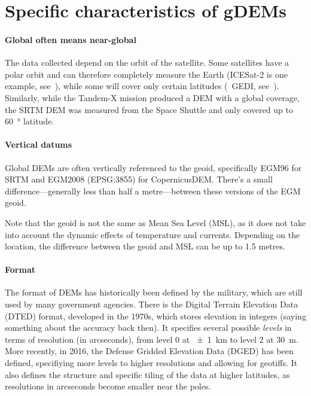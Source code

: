 %
\section[Specific characteristics]{Specific characteristics of gDEMs}

\paragraph{Global often means near-global}

The data collected depend on the orbit of the satellite.
Some satellites have a polar orbit and can therefore completely measure the Earth (ICESat-2 is one example, see~), while some will cover only certain latitudes (\eg\ GEDI, see~).
Similarly, while the Tandem-X mission produced a DEM with a global coverage, the SRTM DEM was measured from the Space Shuttle and only covered up to \qty{60}{\degree} latitude.


\paragraph{Vertical datums}
Global DEMs are often vertically referenced to the geoid, specifically EGM96 for SRTM and EGM2008 (EPSG:3855) for CopernicusDEM.
There's a small difference---generally less than half a metre---between these versions of the EGM geoid.

Note that the geoid is not the same as Mean Sea Level (MSL), as it does not take into account the dynamic effects of temperature and currents.
Depending on the location, the difference between the geoid and MSL can be up to 1.5 metres.

\paragraph{Format}  %
The format of DEMs has historically been defined by the military, which are still used by many government agencies.
There is the Digital Terrain Elevation Data (DTED) format, developed in the 1970s, which stores elevation in integers (saying something about the accuracy back then).
It specifies several possible \emph{levels} in terms of resolution (in arcseconds), from level 0 at \qty{\pm1}{km} to level 2 at \qty{30}{m}.
More recently, in 2016, the Defense Gridded Elevation Data (DGED) has been defined, specifiying more levels to higher resolutions and allowing for geotiffs.
It also defines the structure and specific tiling of the data at higher latitudes, as resolutions in arcseconds become smaller near the poles.

